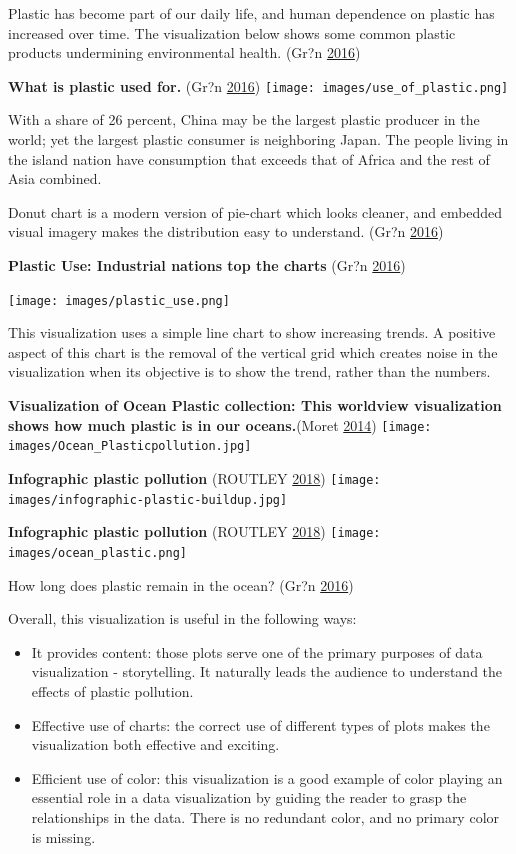 \documentclass[]{book}
\providecommand{\tightlist}{%
  \setlength{\itemsep}{0pt}\setlength{\parskip}{0pt}}
\begin{document}
Plastic has become part of our daily life, and human dependence on plastic has increased over time. The visualization below shows some common plastic products undermining environmental health. (Gr?n \protect\hyperlink{ref-plastic_pollution_visualizations}{2016})

\textbf{What is plastic used for.} (Gr?n \protect\hyperlink{ref-plastic_pollution_visualizations}{2016})
\texttt{[image: images/use\_of\_plastic.png]}

With a share of 26 percent, China may be the largest plastic producer in the world; yet the largest plastic consumer is neighboring Japan. The people living in the island nation have consumption that exceeds that of Africa and the rest of Asia combined.

Donut chart is a modern version of pie-chart which looks cleaner, and embedded visual imagery makes the distribution easy to understand.
(Gr?n \protect\hyperlink{ref-plastic_pollution_visualizations}{2016})

\textbf{Plastic Use: Industrial nations top the charts} (Gr?n \protect\hyperlink{ref-plastic_pollution_visualizations}{2016})

\texttt{[image: images/plastic\_use.png]}

This visualization uses a simple line chart to show increasing trends. A positive aspect of this chart is the removal of the vertical grid which creates noise in the visualization when its objective is to show the trend, rather than the numbers.

\textbf{Visualization of Ocean Plastic collection: This worldview visualization shows how much plastic is in our oceans.}(Moret \protect\hyperlink{ref-ocean_plastic_pollution}{2014})
\texttt{[image: images/Ocean\_Plasticpollution.jpg]}

\textbf{Infographic plastic pollution} (ROUTLEY \protect\hyperlink{ref-plastic_pollution_infographics}{2018})
\texttt{[image: images/infographic-plastic-buildup.jpg]}

\textbf{Infographic plastic pollution} (ROUTLEY \protect\hyperlink{ref-plastic_pollution_infographics}{2018})
\texttt{[image: images/ocean\_plastic.png]}

How long does plastic remain in the ocean? (Gr?n \protect\hyperlink{ref-plastic_pollution_visualizations}{2016})

Overall, this visualization is useful in the following ways:

\begin{itemize}
\tightlist
\item
  It provides content: those plots serve one of the primary purposes of data visualization - storytelling. It naturally leads the audience to understand the effects of plastic pollution.
\item
  Effective use of charts: the correct use of different types of plots makes the visualization both effective and exciting.
\item
  Efficient use of color: this visualization is a good example of color playing an essential role in a data visualization by guiding the reader to grasp the relationships in the data. There is no redundant color, and no primary color is missing.
\end{itemize}
\end{document}
